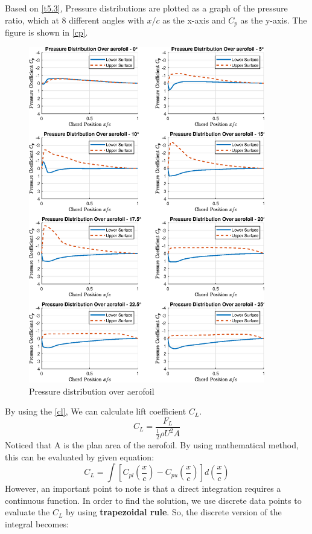 Based on \autoref{t5.3}, Pressure distributions are plotted as a graph of the pressure ratio, which at 8 different angles with $x/c$ as the x-axis and $C_p$ as the y-axis. The figure is shown in \autoref{cp}.
\begin{figure}[htbp]
    \centering
    \includegraphics[width=0.92\textwidth]{output.eps}
    \caption{Pressure distribution over aerofoil}
    \label{cp}
  \end{figure}
By using the \autoref{cl}, We can calculate lift coefficient $C_L$.
\begin{equation}
    \label{cl}
C_{L}={\frac{F_{L}}{{\frac{1}{2}}\rho U^{2}A}}
\end{equation}
Noticed that A is the plan area of the aerofoil. By using mathematical method, this can be evaluated by given equation:
$$
C_{L}=\int\left[C_{p l}\left(\frac{x}{c}\right)-C_{p u}\left(\frac{x}{c}\right)\right]d\left(\frac{x}{c}\right)
$$
However, an important point to note is that a direct integration requires a continuous function. In order to find the solution, we use discrete data points to evaluate the $C_L$ by using \textbf{trapezoidal rule}. So, the discrete version of the integral becomes:
